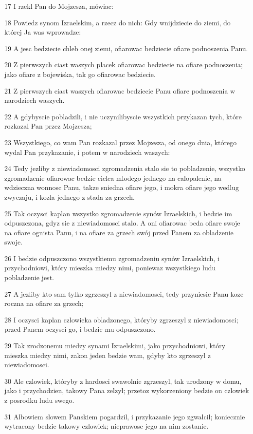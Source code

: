 \par 17 I rzekl Pan do Mojzesza, mówiac:
\par 18 Powiedz synom Izraelskim, a rzecz do nich: Gdy wnijdziecie do ziemi, do której Ja was wprowadze:
\par 19 A jesc bedziecie chleb onej ziemi, ofiarowac bedziecie ofiare podnoszenia Panu.
\par 20 Z pierwszych ciast waszych placek ofiarowac bedziecie na ofiare podnoszenia; jako ofiare z bojewiska, tak go ofiarowac bedziecie.
\par 21 Z pierwszych ciast waszych ofiarowac bedziecie Panu ofiare podnoszenia w narodziech waszych.
\par 22 A gdybyscie pobladzili, i nie uczynilibyscie wszystkich przykazan tych, które rozkazal Pan przez Mojzesza;
\par 23 Wszystkiego, co wam Pan rozkazal przez Mojzesza, od onego dnia, którego wydal Pan przykazanie, i potem w narodziech waszych:
\par 24 Tedy jezliby z niewiadomosci zgromadzenia stalo sie to pobladzenie, wszystko zgromadzenie ofiarowac bedzie cielca mlodego jednego na calopalenie, na wdzieczna wonnosc Panu, takze sniedna ofiare jego, i mokra ofiare jego wedlug zwyczaju, i kozla jednego z stada za grzech.
\par 25 Tak oczysci kaplan wszystko zgromadzenie synów Izraelskich, i bedzie im odpuszczona, gdyz sie z niewiadomosci stalo. A oni ofiarowac beda ofiare swoje na ofiare ognista Panu, i na ofiare za grzech swój przed Panem za obladzenie swoje.
\par 26 I bedzie odpuszczono wszystkiemu zgromadzeniu synów Izraelskich, i przychodniowi, który mieszka miedzy nimi, poniewaz wszystkiego ludu pobladzenie jest.
\par 27 A jezliby kto sam tylko zgrzeszyl z niewiadomosci, tedy przyniesie Panu koze roczna na ofiare za grzech;
\par 28 I oczysci kaplan czlowieka obladzonego, któryby zgrzeszyl z niewiadomosci; przed Panem oczysci go, i bedzie mu odpuszczono.
\par 29 Tak zrodzonemu miedzy synami Izraelskimi, jako przychodniowi, który mieszka miedzy nimi, zakon jeden bedzie wam, gdyby kto zgrzeszyl z niewiadomosci.
\par 30 Ale czlowiek, któryby z hardosci swawolnie zgrzeszyl, tak urodzony w domu, jako i przychodzien, takowy Pana zelzyl; przetoz wykorzeniony bedzie on czlowiek z posrodku ludu swego.
\par 31 Albowiem slowem Panskiem pogardzil, i przykazanie jego zgwalcil; koniecznie wytracony bedzie takowy czlowiek; nieprawosc jego na nim zostanie.
